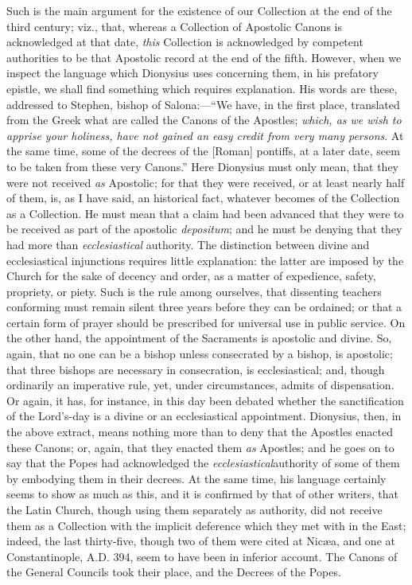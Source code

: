 Such is the main argument for the existence of our Collection at
the end of the third century; viz., that, whereas a Collection of
Apostolic Canons is acknowledged at that date, \emph{this} Collection
is acknowledged by competent authorities to be that Apostolic record
at the end of the fifth. However, when we inspect the language which
Dionysius uses concerning them, in his prefatory epistle, we shall
find something which requires explanation. His words are these,
addressed to Stephen, bishop of Salona:—``We have, in the first
place, translated from the Greek what are called the Canons of the
Apostles; \emph{which, as we wish to apprise your holiness, have not
gained an easy credit from very many persons}. At the same time,
some of the decrees of the [Roman] pontiffs, at a later date,
seem to be taken from these very Canons.'' Here Dionysius must
only mean, that they were not received \emph{as} Apostolic; for that
they were received, or at least nearly half of them, is, as I have
said, an historical fact, whatever becomes of the Collection as a
Collection. He must mean that a claim had been advanced that they were
to be received as part of the apostolic \emph{depositum}; and he must
be denying that they had more than \emph{ecclesiastical} authority.
The distinction between divine and ecclesiastical injunctions requires
little explanation: the latter are imposed by the Church for the sake
of decency and order, as a matter of expedience, safety, propriety, or
piety. Such is the rule among ourselves, that dissenting teachers
conforming must remain silent three years before they can be ordained;
or that a certain form of prayer should be prescribed for universal
use in public service. On the other hand, the appointment of the
Sacraments is apostolic and divine. So, again, that no one can be a
bishop unless consecrated by a bishop, is apostolic; that three
bishops are necessary in consecration, is ecclesiastical; and, though
ordinarily an imperative rule, yet, under circumstances, admits of
dispensation. Or again, it has, for instance, in this day been debated
whether the sanctification of the Lord's-day is a divine or an
ecclesiastical appointment. Dionysius, then, in the above extract,
means nothing more than to deny that the Apostles enacted these
Canons; or, again, that they enacted them \emph{as} Apostles; and he
goes on to say that the Popes had acknowledged the \emph{ecclesiastical}authority
of some of them by embodying them in their decrees. At the same time,
his language certainly seems to show as much as this, and it is
confirmed by that of other writers, that the Latin Church, though
using them separately as authority, did not receive them as a
Collection with the implicit deference which they met with in the
East; indeed, the last thirty-five, though two of them were cited at
Nicæa, and one at Constantinople, A.D. 394,
seem to have been in inferior account. The Canons of the General
Councils took their place, and the Decrees of the Popes.

